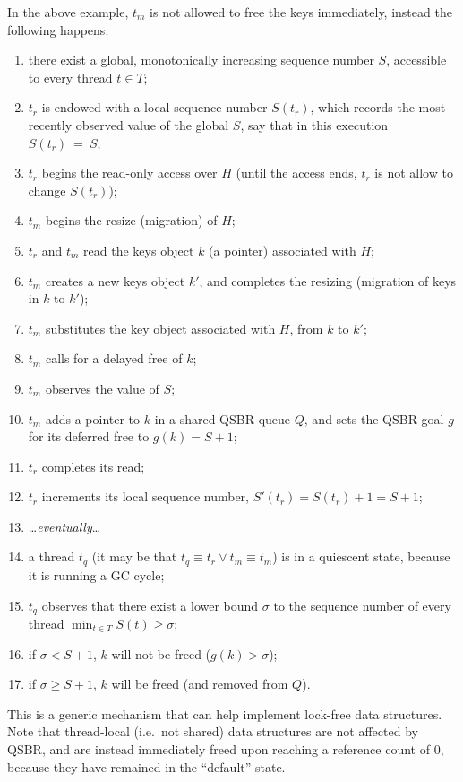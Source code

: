 In the above example, $t_m$ is not allowed to free the keys immediately, instead the following happens:
\begin{enumerate}
    \item there exist a global, monotonically increasing sequence number $S$, accessible to every thread $t \in T$;
    \item $t_r$ is endowed with a local sequence number $S(t_r)$, which records the most recently observed value of the global $S$, say that in this execution $S(t_r)~=~S$;
    \item $t_r$ begins the read-only access over $H$ (until the access ends, $t_r$ is not allow to change $S(t_r)$);
    \item $t_m$ begins the resize (migration) of $H$;
    \item $t_r$ and $t_m$ read the keys object $k$ (a pointer) associated with $H$;
    \item $t_m$ creates a new keys object $k'$, and completes the resizing (migration of keys in $k$ to $k'$);
    \item $t_m$ substitutes the key object associated with $H$, from $k$ to $k'$;
    \item $t_m$ calls for a delayed free of $k$;
    \item $t_m$ observes the value of $S$;
    \item $t_m$ adds a pointer to $k$ in a shared QSBR queue $Q$, and sets the QSBR goal $g$ for its deferred free to $g(k) = S + 1$;
    \item $t_r$ completes its read;
    \item $t_r$ increments its local sequence number, $S'(t_r) = S(t_r) + 1 = S + 1$;
    \item \ldots\emph{eventually}\ldots
    \item a thread $t_q$ (it may be that $t_q \equiv t_r \vee t_m \equiv t_m$) is in a quiescent state, because it is running a GC cycle;
    \item $t_q$ observes that there exist a lower bound $\sigma$ to the sequence number of every thread $\min_{t \in T} S(t) \geq \sigma$;
    \item if $\sigma < S + 1$, $k$ will not be freed ($g(k) > \sigma$);
    \item if $\sigma \geq S + 1$, $k$ will be freed (and removed from $Q$).
\end{enumerate}

This is a generic mechanism that can help implement lock-free data structures.
Note that thread-local (i.e.\ not shared) data structures are not affected by QSBR, and are instead immediately freed upon reaching a reference count of 0, because they have remained in the ``default'' state.


